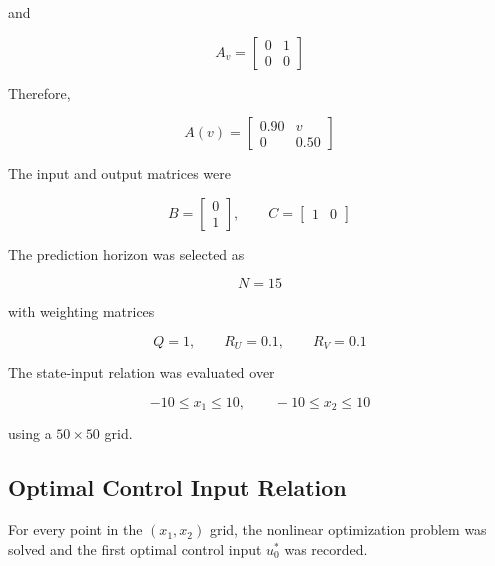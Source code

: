 and

\begin{equation}
    A_v
    =
    \begin{bmatrix}
        0 & 1 \\
        0 & 0
    \end{bmatrix}
\end{equation}

Therefore,

\begin{equation}
    A(v)
    =
    \begin{bmatrix}
        0.90 & v \\
        0 & 0.50
    \end{bmatrix}
\end{equation}

The input and output matrices were

\begin{equation}
    B
    =
    \begin{bmatrix}
        0 \\
        1
    \end{bmatrix},
    \qquad
    C
    =
    \begin{bmatrix}
        1 & 0
    \end{bmatrix}
\end{equation}

The prediction horizon was selected as

\begin{equation}
    N=15
\end{equation}

with weighting matrices

\begin{equation}
    Q=1,
    \qquad
    R_U=0.1,
    \qquad
    R_V=0.1
\end{equation}

The state-input relation was evaluated over

\begin{equation}
    -10
    \leq
    x_1
    \leq
    10,
    \qquad
    -10
    \leq
    x_2
    \leq
    10
\end{equation}

using a \(50\times50\) grid.

\subsection{Optimal Control Input Relation}

For every point in the \((x_1,x_2)\) grid, the nonlinear optimization
problem was solved and the first optimal control input \(u_0^\ast\) was
recorded.

